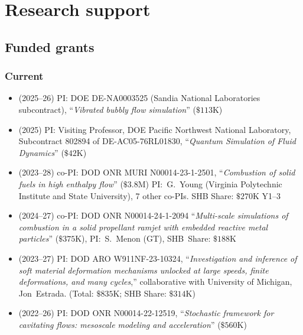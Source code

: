 \section{Research support}

% 

\subsection{Funded grants}

\subsubsection{Current}

\begin{itemize}
    \item (2025--26) PI: DOE DE-NA0003525 (Sandia National Laboratories subcontract), ``\textit{Vibrated bubbly flow simulation}'' ($\$113$K)
    \item (2025) PI: Visiting Professor, DOE Pacific Northwest National Laboratory, Subcontract 802894 of DE-AC05-76RL01830, ``\textit{Quantum Simulation of Fluid Dynamics}'' ($\$42$K)
    \item (2023--28) co-PI: DOD ONR MURI N00014-23-1-2501, ``\textit{Combustion of solid fuels in high enthalpy flow}'' ($\$3.8$M) PI:~G.~Young (Virginia Polytechnic Institute and State University), 7 other co-PIs. SHB Share: $\$270$K Y1--3
    \item (2024--27) co-PI: DOD ONR N00014-24-1-2094 ``\textit{Multi-scale simulations of combustion in a solid propellant ramjet with embedded reactive metal particles}'' ($\$375$K), PI:~S.~Menon (GT), SHB~Share: $\$188$K 
    \item (2023--27) PI: DOD ARO W911NF-23-10324, ``\textit{Investigation and inference of soft material deformation mechanisms unlocked at large speeds, finite deformations, and many cycles},'' collaborative with University of Michigan, Jon~Estrada. (Total: $\$835$K; SHB Share: $\$314$K)
    \item (2022--26) PI: DOD ONR N00014-22-12519, ``\textit{Stochastic framework for cavitating flows: mesoscale modeling and acceleration}'' ($\$560$K)
\end{itemize}

